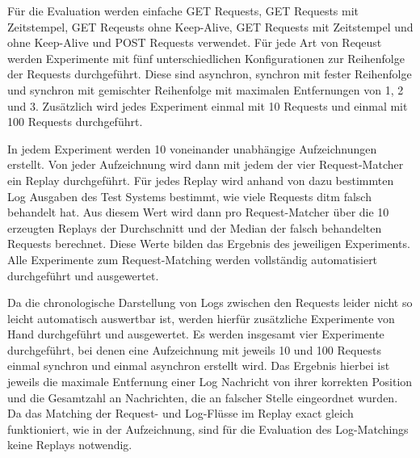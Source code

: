 \documentclass[12pt,a4paper]{report}
\begin{document}
Für die Evaluation werden einfache GET Requests, GET Requests mit Zeitstempel, GET Reqeusts ohne Keep-Alive, GET Requests mit
Zeitstempel und ohne Keep-Alive und POST Requests verwendet. Für jede Art von Reqeust werden Experimente mit fünf unterschiedlichen
Konfigurationen zur Reihenfolge der Requests durchgeführt. Diese sind asynchron, synchron mit fester Reihenfolge und synchron mit gemischter
Reihenfolge mit maximalen Entfernungen von 1, 2 und 3. Zusätzlich wird jedes Experiment einmal mit 10 Requests und einmal mit 100 Requests
durchgeführt.

In jedem Experiment werden 10 voneinander unabhängige Aufzeichnungen erstellt. Von jeder Aufzeichnung wird dann mit jedem der vier
Request-Matcher ein Replay durchgeführt. Für jedes Replay wird anhand von dazu bestimmten Log Ausgaben des Test Systems bestimmt,
wie viele Requests ditm falsch behandelt hat. Aus diesem Wert wird dann pro Request-Matcher über die 10 erzeugten Replays der Durchschnitt
und der Median der falsch behandelten Requests berechnet. Diese Werte bilden das Ergebnis des jeweiligen Experiments.
Alle Experimente zum Request-Matching werden vollständig automatisiert durchgeführt und ausgewertet. %

Da die chronologische Darstellung von Logs zwischen den Requests leider nicht so leicht automatisch auswertbar ist, werden hierfür
zusätzliche Experimente von Hand durchgeführt und ausgewertet. Es werden insgesamt vier Experimente durchgeführt, bei denen eine
Aufzeichnung mit jeweils 10 und 100 Requests einmal synchron und einmal asynchron erstellt wird. Das Ergebnis hierbei ist jeweils
die maximale Entfernung einer Log Nachricht von ihrer korrekten Position und die Gesamtzahl an Nachrichten, die an falscher Stelle
eingeordnet wurden. Da das Matching der Request- und Log-Flüsse im Replay exact gleich funktioniert, wie in der Aufzeichnung, sind
für die Evaluation des Log-Matchings keine Replays notwendig.
\end{document}
